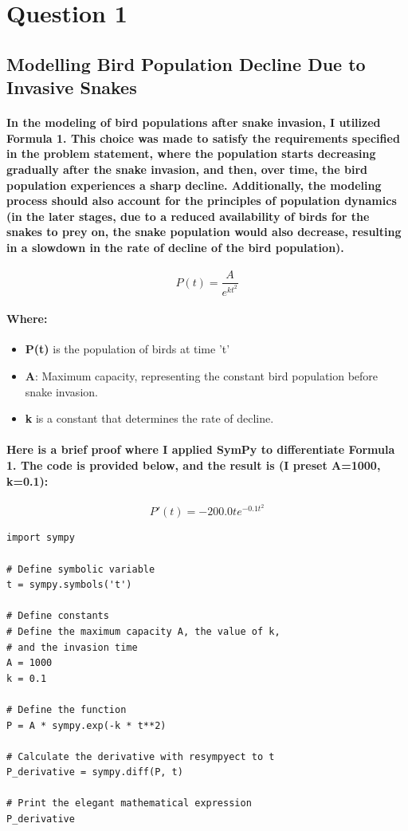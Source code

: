 % 
\section{Question 1}
\subsection{Modelling Bird Population Decline Due to Invasive Snakes}
% 
\paragraph{In the modeling of bird populations after snake invasion, I utilized \textbf{Formula 1}. This choice was made to satisfy the requirements specified in the problem statement, where the population starts decreasing gradually after the snake invasion, and then, over time, the bird population experiences a sharp decline. Additionally, the modeling process should also account for the principles of \textbf{population dynamics} (in the later stages, due to a reduced availability of birds for the snakes to prey on, the snake population would also decrease, resulting in a slowdown in the rate of decline of the bird population).}
% 
% 
\begin{equation}
    P(t)=\frac{A}{e^{kt^2}}
\end{equation}
% 
% 
% 
% 
\paragraph{Where:}
\begin{itemize}
    \item \textbf{P(t)} is the population of birds at time 't'
    \item \textbf{A}: Maximum capacity, representing the constant bird population before snake invasion.
    \item \textbf{k} is a constant that determines the rate of decline.
\end{itemize}
% 
% 
% 
% 
\paragraph{Here is a brief proof where I applied SymPy to differentiate Formula 1. The code is provided below, and the result is (I preset A=1000, k=0.1):}
\begin{equation}
    P'(t)=-200.0te^{-0.1t^2}
\end{equation}
% 
\begin{lstlisting}[style=pystyle]
import sympy

# Define symbolic variable
t = sympy.symbols('t')

# Define constants
# Define the maximum capacity A, the value of k, 
# and the invasion time
A = 1000
k = 0.1

# Define the function
P = A * sympy.exp(-k * t**2)

# Calculate the derivative with resympyect to t
P_derivative = sympy.diff(P, t)

# Print the elegant mathematical expression
P_derivative
\end{lstlisting}
% 
% 
% 
% 
